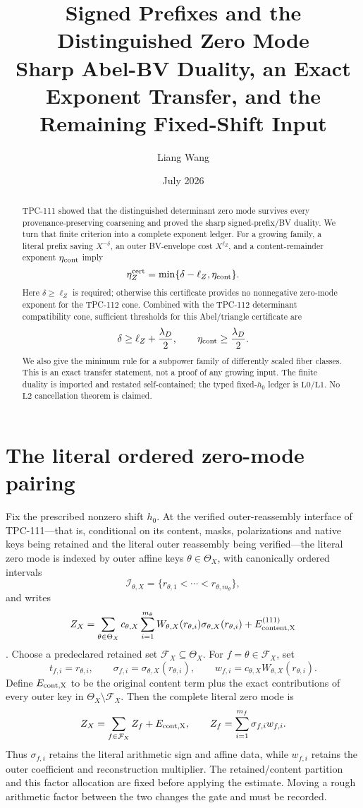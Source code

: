 \documentclass[11pt]{article}
\title{\textbf{Signed Prefixes and the Distinguished Zero Mode}\\
\large Sharp Abel-BV Duality, an Exact Exponent Transfer, and the
Remaining Fixed-Shift Input}
\author{Liang Wang}
\date{July 2026}
\theoremstyle{definition}
\theoremstyle{remark}
\newcommand{\cF}{\mathcal F}
\newcommand{\Lzero}{\mathrm{L0}}
\newcommand{\Lone}{\mathrm{L1}}
\newcommand{\Ltwo}{\mathrm{L2}}
\begin{document}
\maketitle

\begin{abstract}
TPC-111 showed that the distinguished determinant zero mode survives
every provenance-preserving coarsening and proved the sharp
signed-prefix/BV duality.  We turn that finite criterion into a
complete exponent ledger.  For a growing family, a literal prefix
saving \(X^{-\delta}\), an outer BV-envelope cost \(X^{\ell_Z}\), and
a content-remainder exponent \(\eta_{\rm cont}\) imply
\[
 \eta_Z^{\rm cert}
 =\min\{\delta-\ell_Z,\eta_{\rm cont}\}.
\]
Here \(\delta\ge\ell_Z\) is required; otherwise this certificate
provides no nonnegative zero-mode exponent for the TPC-112 cone.
Combined with the TPC-112 determinant compatibility cone, sufficient
thresholds for this Abel/triangle certificate are
\[
 \delta\ge\ell_Z+\frac{\lambda_D}{2},
 \qquad
 \eta_{\rm cont}\ge\frac{\lambda_D}{2}.
\]
We also give the minimum rule for a subpower family of differently
scaled fiber classes.  This is an exact transfer statement, not a
proof of any growing input.  The finite duality is imported and
restated self-contained; the typed fixed-\(h_0\) ledger is
\(\Lzero/\Lone\).  No \(\Ltwo\) cancellation theorem is claimed.
\end{abstract}

\section{The literal ordered zero-mode pairing}

Fix the prescribed nonzero shift \(h_0\).  At the verified
outer-reassembly interface of TPC-111---that is, conditional on its
content, masks, polarizations and native keys being retained and the
literal outer reassembly being verified---the literal zero mode is
indexed by outer affine keys \(\theta\in\Theta_X\), with canonically
ordered intervals
\[
 \mathcal I_{\theta,X}
 =\{r_{\theta,1}<\cdots<r_{\theta,m_\theta}\},
\]
and writes
\[
 Z_X=
 \sum_{\theta\in\Theta_X}c_{\theta,X}
 \sum_{i=1}^{m_\theta}
 W_{\theta,X}(r_{\theta,i})
 \sigma_{\theta,X}(r_{\theta,i})
 +E_{\rm content,X}^{(111)}
\]
\citep{WangTPC111}.  Choose a predeclared retained set
\(\cF_X\subseteq\Theta_X\).  For \(f=\theta\in\cF_X\), set
\[
 t_{f,i}=r_{\theta,i},\qquad
 \sigma_{f,i}=\sigma_{\theta,X}(r_{\theta,i}),\qquad
 w_{f,i}=c_{\theta,X}W_{\theta,X}(r_{\theta,i}).
\]
Define \(E_{\rm cont,X}\) to be the original content term plus the
exact contributions of every outer key in
\(\Theta_X\setminus\cF_X\).  Then the complete literal zero mode is
\[
 Z_X=\sum_{f\in\cF_X}Z_f+E_{\rm cont,X},\qquad
 Z_f=\sum_{i=1}^{m_f}\sigma_{f,i}w_{f,i}.
\]
Thus \(\sigma_{f,i}\) retains the literal arithmetic sign and affine
data, while \(w_{f,i}\) retains the outer coefficient and
reconstruction multiplier.  The retained/content partition and this
factor allocation are fixed before applying the estimate.  Moving a
rough arithmetic factor between the two changes the gate and must be
recorded.
\end{document}
